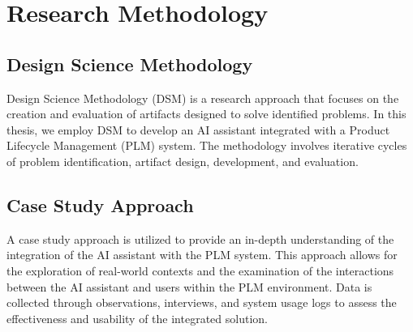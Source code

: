 \chapter{Research Methodology}
\label{ch:research-methodology}

\section{Design Science Methodology}
\label{sec:design-science-methodology}

Design Science Methodology (DSM) is a research approach that focuses on the creation and evaluation of artifacts designed to solve identified problems. In this thesis, we employ DSM to develop an AI assistant integrated with a Product Lifecycle Management (PLM) system. The methodology involves iterative cycles of problem identification, artifact design, development, and evaluation.

\section{Case Study Approach}
\label{sec:case-study-approach}

A case study approach is utilized to provide an in-depth understanding of the integration of the AI assistant with the PLM system. This approach allows for the exploration of real-world contexts and the examination of the interactions between the AI assistant and users within the PLM environment. Data is collected through observations, interviews, and system usage logs to assess the effectiveness and usability of the integrated solution.
